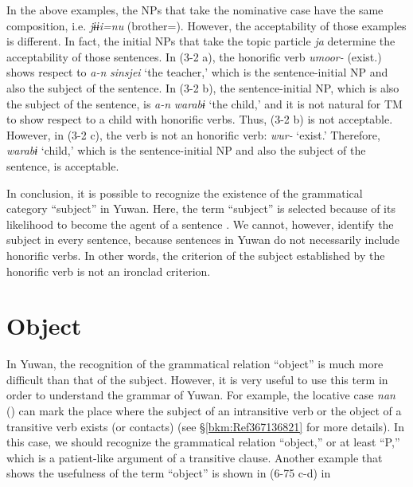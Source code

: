 In the above examples, the NPs that take the nominative case have the same composition, i.e. \textit{jɨɨi=nu} (brother=\NOM). However, the acceptability of those examples is different. In fact, the initial NPs that take the topic particle \textit{ja} determine the acceptability of those sentences. In (3-2 a), the honorific verb \textit{umoor-} (exist.\HON) shows respect to \textit{a-n} \textit{sinsjei} ‘the teacher,’ which is the sentence-initial NP and also the subject of the sentence. In (3-2 b), the sentence-initial NP, which is also the subject of the sentence, is \textit{a-n} \textit{warabɨ} ‘the child,’ and it is not natural for TM to show respect to a child with honorific verbs. Thus, (3-2 b) is not acceptable. However, in (3-2 c), the verb is not an honorific verb: \textit{wur-} ‘exist.’ Therefore, \textit{warabɨ} ‘child,’ which is the sentence-initial NP and also the subject of the sentence, is acceptable.

In conclusion, it is possible to recognize the existence of the grammatical category “subject” in Yuwan. Here, the term “subject” is selected because of its likelihood to become the agent of a sentence \citep[cf.][136]{Andrews2007}. We cannot, however, identify the subject in every sentence, because sentences in Yuwan do not necessarily include honorific verbs. In other words, the criterion of the subject established by the honorific verb is not an ironclad criterion.

\section{Object}
\label{bkm:Ref350115710}\hypertarget{RefHeadingToc395696989}{}
In Yuwan, the recognition of the grammatical relation “object” is much more difficult than that of the subject. However, it is very useful to use this term in order to understand the grammar of Yuwan. For example, the locative case \textit{nan} (\LOCOne) can mark the place where the subject of an intransitive verb or the object of a transitive verb exists (or contacts) (see §\ref{bkm:Ref367136821} for more details). In this case, we should recognize the grammatical relation “object,” or at least “P,” which is a patient-like argument of a transitive clause. Another example that shows the usefulness of the term “object” is shown in (6-75 c-d) in 
